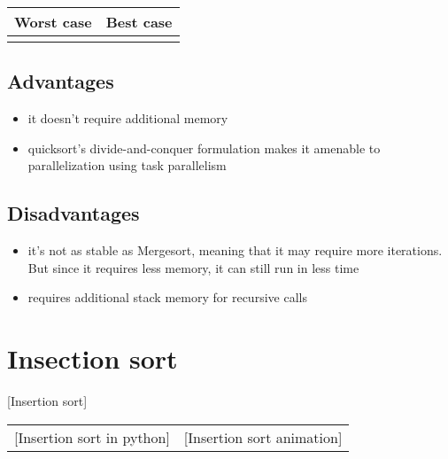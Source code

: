 \documentclass{article}
\begin{document}
			\begin{tabular}{c|c}
				Worst case & Best case\\
				\hline
				\timeComplexWorstCase
				&
				\timeComplexBestCase
			\end{tabular}

		\begin{minipage}[t]{0.45\textwidth}
			\subsection{Advantages}
			\begin{itemize}
					\item it doesn't require additional memory
					\item quicksort's divide-and-conquer formulation makes it amenable to parallelization using task parallelism
			\end{itemize}
		\end{minipage}
		\begin{minipage}[t]{0.5\textwidth}
			\subsection{Disadvantages}
			\begin{itemize}
				\item it's not as stable as Mergesort, meaning that it may require more iterations. But since it requires less memory, it can still run in less time
				\item requires additional stack memory for recursive calls
			\end{itemize}
		\end{minipage}

	\newpage
	\section{Insection sort}
		[Insertion sort]

		\begin{tabular}{cc}
			\begin{minipage}{0.5\textwidth}
				{insertSort}[Insertion sort in python]
			\end{minipage}
			&
			\begin{minipage}{0.5\textwidth}
				\myHref{https://giphy.com/gifs/sort-of-wB7b5m0sNkKGI/fullscreen}[Insertion sort animation]
			\end{minipage}
		\end{tabular}
\end{document}
